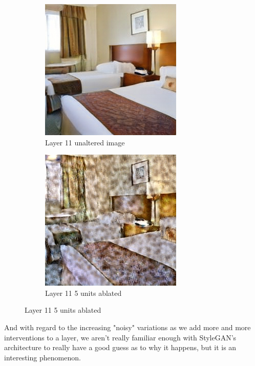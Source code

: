 \documentclass{article}
\begin{document}
\begin{figure}[h!]
\caption{Noise increase with ablation in Style GAN}
    \centering
    \begin{subfigure}[h!]{0.35\textwidth}
        \caption{Layer 11 unaltered image}
        \includegraphics[scale=0.3]{images/sg_layer11_no_ablate.jpg}
    \end{subfigure}
    \begin{subfigure}[h!]{0.35\textwidth}
        \caption{Layer 11 5 units ablated}
        \includegraphics[scale=0.3]{images/sg_layer11_5_units_ablate.jpeg}
    \end{subfigure}
\end{figure}

And with regard to the increasing "noisy" variations as we add more and more interventions to a layer, we aren't really familiar enough with StyleGAN's architecture to really have a good guess as to why it happens, but it is an interesting phenomenon. 
\end{document}
